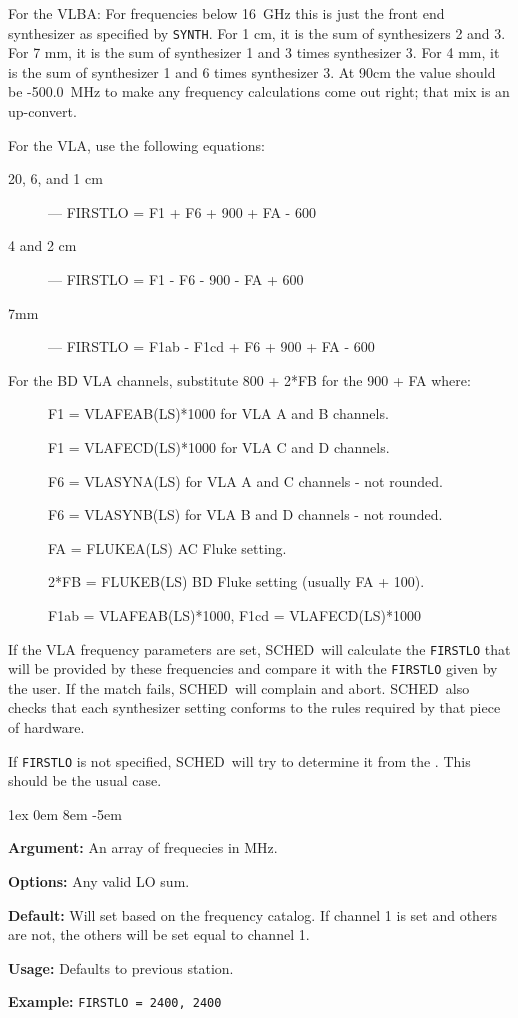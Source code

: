 \documentclass{report}
\newcommand{\schedb}{{\sc SCHED~}}
\newcommand{\rcwbox}[5]{
  \begin{list}{}{\parsep 1ex  \itemsep 0em
                 \leftmargin 8em  \itemindent -5em }
    \item {\bf Argument:} #1
    \item {\bf Options:}  #2
    \item {\bf Default:}  #3
    \item {\bf Usage:}    #4
    \item {\bf Example:}  #5
  \end{list}
}
\begin{document}
For the VLBA: For frequencies below 16~GHz this is just the front end
synthesizer as specified by {\tt SYNTH}.  For 1 cm, it is the sum of
synthesizers 2 and 3.  For 7 mm, it is the sum of synthesizer 1 and 3
times synthesizer 3.  For 4 mm, it is the sum of synthesizer 1 and 6
times synthesizer 3.  At 90cm the value should be -500.0~MHz to make
any frequency calculations come out right; that mix is an up-convert.

For the VLA, use the following equations:
\begin{description}
\item[20, 6, and 1 cm] --- FIRSTLO = F1 + F6 + 900 + FA - 600
\item[4 and 2 cm]  --- FIRSTLO = F1 - F6 - 900 - FA + 600
\item[7mm] --- FIRSTLO = F1ab - F1cd + F6 + 900 + FA - 600
\end{description}
For the BD VLA channels, substitute 800 + 2*FB for the 900 + FA
where:
\begin{description}
\item[] F1 = VLAFEAB(LS)*1000 for VLA A and B channels.
\item[] F1 = VLAFECD(LS)*1000 for VLA C and D channels.
\item[] F6 = VLASYNA(LS) for VLA A and C channels - not rounded.
\item[] F6 = VLASYNB(LS) for VLA B and D channels - not rounded.
\item[] FA = FLUKEA(LS)  AC Fluke setting.
\item[] 2*FB = FLUKEB(LS)  BD Fluke setting (usually FA + 100).
\item[] F1ab = VLAFEAB(LS)*1000, F1cd = VLAFECD(LS)*1000
\end{description}

If the VLA frequency parameters are set, \schedb will calculate
the {\tt FIRSTLO} that will be provided by these frequencies and
compare it with the {\tt FIRSTLO} given by the user.  If the
match fails, \schedb will complain and abort.  \schedb also checks
that each synthesizer setting conforms to the rules required by
that piece of hardware.

If {\tt FIRSTLO} is not specified, \schedb will try to determine it
from the .  This should be
the usual case.

\rcwbox
{An array of frequecies in MHz.}
{Any valid LO sum.}
{Will set based on the frequency catalog.  If channel 1 is set and
others are not, the others will be set equal to channel 1.}
{Defaults to previous station.}
{{\tt FIRSTLO = 2400, 2400}}
\end{document}
